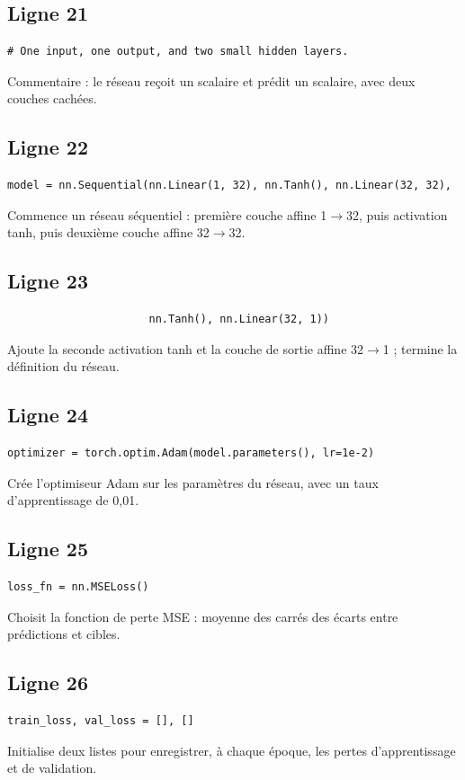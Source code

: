 \documentclass[11pt,a4paper]{article}
\begin{document}
\subsection*{Ligne 21}
\begin{lstlisting}
# One input, one output, and two small hidden layers.
\end{lstlisting}
Commentaire : le réseau reçoit un scalaire et prédit un scalaire, avec deux couches cachées.

\subsection*{Ligne 22}
\begin{lstlisting}
model = nn.Sequential(nn.Linear(1, 32), nn.Tanh(), nn.Linear(32, 32),
\end{lstlisting}
Commence un réseau séquentiel : première couche affine 1$\to$32, puis activation tanh, puis deuxième couche affine 32$\to$32.

\subsection*{Ligne 23}
\begin{lstlisting}
                      nn.Tanh(), nn.Linear(32, 1))
\end{lstlisting}
Ajoute la seconde activation tanh et la couche de sortie affine 32$\to$1 ; termine la définition du réseau.

\subsection*{Ligne 24}
\begin{lstlisting}
optimizer = torch.optim.Adam(model.parameters(), lr=1e-2)
\end{lstlisting}
Crée l'optimiseur Adam sur les paramètres du réseau, avec un taux d'apprentissage de 0,01.

\subsection*{Ligne 25}
\begin{lstlisting}
loss_fn = nn.MSELoss()
\end{lstlisting}
Choisit la fonction de perte MSE : moyenne des carrés des écarts entre prédictions et cibles.

\subsection*{Ligne 26}
\begin{lstlisting}
train_loss, val_loss = [], []
\end{lstlisting}
Initialise deux listes pour enregistrer, à chaque époque, les pertes d'apprentissage et de validation.
\end{document}
